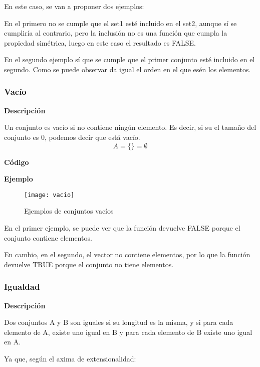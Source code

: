     En este caso, se van a proponer dos ejemplos:

    En el primero no se cumple que el set1 est\'e incluido en el set2, aunque s\'i se cumplir\'ia al contrario, pero la inclusi\'on no es 
    una funci\'on que cumpla la propiedad sim\'etrica, luego en este caso el resultado es FALSE.

    En el segundo ejemplo s\'i que se cumple que el primer conjunto est\'e incluido en el segundo. Como se puede observar da igual el orden 
    en el que es\'en los elementos.



\subsubsection{Vac\'io}

    \textbf{Descripci\'on}

    Un conjunto es vac\'io si no contiene ning\'un elemento. Es decir, si su el tama\~no del conjunto es 0, 
    podemos decir que est\'a vac\'io. 
    \[
    A = \{ \} = \emptyset
    \]

    \textbf{C\'odigo}

    

    \textbf{Ejemplo}

    \begin{figure}[H]
        \centering
        \texttt{[image: vacio]}
        \caption{Ejemplos de conjuntos vac\'ios}
        \label{fig:vacio}
    \end{figure}

    En el primer ejemplo, se puede ver que la funci\'on devuelve FALSE porque el conjunto contiene elementos.

    En cambio, en el segundo, el vector no contiene elementos, por lo que la funci\'on devuelve TRUE porque el conjunto no tiene 
    elementos.


\subsubsection{Igualdad}

    \textbf{Descripci\'on}

    Dos conjuntos A y B son iguales si su longitud es la misma, y si para cada elemento de A, existe uno igual 
    en B y para cada elemento de B existe uno igual en A.

    Ya que, seg\'un el axima de extensionalidad:

